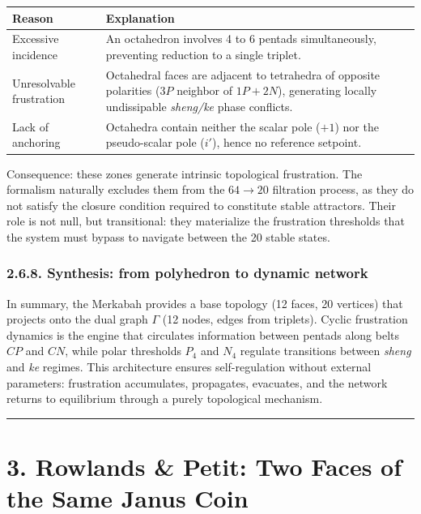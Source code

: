 \documentclass[11pt]{article}
\begin{document}
\begin{table}[H]
\centering
\small
\begin{tabularx}{\textwidth}{@{}lX@{}}
\toprule
Reason & Explanation \\
\midrule
Excessive incidence & An octahedron involves 4 to 6 pentads simultaneously, preventing reduction to a single triplet. \\
Unresolvable frustration & Octahedral faces are adjacent to tetrahedra of opposite polarities ($3P$ neighbor of $1P+2N$), generating locally undissipable \textit{sheng/ke} phase conflicts. \\
Lack of anchoring & Octahedra contain neither the scalar pole ($+1$) nor the pseudo-scalar pole ($i'$), hence no reference setpoint. \\
\bottomrule
\end{tabularx}
\end{table}

Consequence: these zones generate intrinsic topological frustration. The
formalism naturally excludes them from the \(64 \to 20\) filtration
process, as they do not satisfy the closure condition required to
constitute stable attractors. Their role is not null, but transitional:
they materialize the frustration thresholds that the system must bypass
to navigate between the 20 stable states.

\hypertarget{synthesis-from-polyhedron-to-dynamic-network}{%
\subsubsection{2.6.8. Synthesis: from polyhedron to dynamic
network}\label{synthesis-from-polyhedron-to-dynamic-network}}

In summary, the Merkabah provides a base topology (12 faces, 20
vertices) that projects onto the dual graph \(\Gamma\) (12 nodes, edges
from triplets). Cyclic frustration dynamics is the engine that
circulates information between pentads along belts \(CP\) and \(CN\),
while polar thresholds \(P_4\) and \(N_4\) regulate transitions between
\textit{sheng} and \textit{ke} regimes. This architecture ensures
self-regulation without external parameters: frustration accumulates,
propagates, evacuates, and the network returns to equilibrium through a
purely topological mechanism.

\begin{center}\rule{0.5\linewidth}{0.5pt}\end{center}

\hypertarget{rowlands-petit-two-faces-of-the-same-janus-coin}{%
\section{3. Rowlands \& Petit: Two Faces of the Same Janus
Coin}\label{rowlands-petit-two-faces-of-the-same-janus-coin}}
\end{document}
